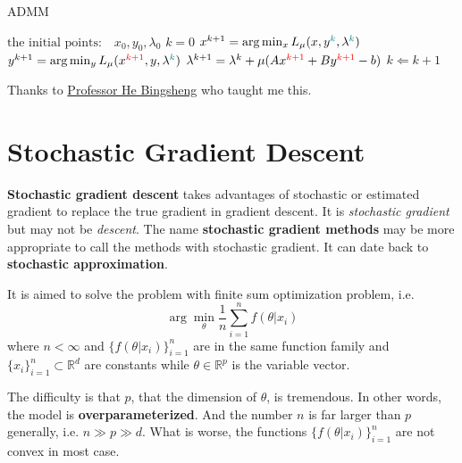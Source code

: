\documentclass[titlestyle=hang,11pt]{elegantbook}
\begin{document}
\begin{algorithm}
	\caption{ADMM}
	\label{ADMM}
	\begin{algorithmic}
	\REQUIRE $\text{the initial points:}\quad x_0, y_0, {\lambda}_0$
	\ENSURE $k = 0$
	\STATE $x^{k+1}=\arg\min_{x}L_{\mu}(x,y^{\color{teal}{k}},\lambda^{\color{teal}{k}})$
	\STATE $y^{k+1}=\arg\min_{y} L_{\mu}(x^{\color{red}{k+1}}, y, \lambda^{\color{teal}{k}})$
	\STATE $\lambda^{k+1} = \lambda^{k}+\mu (Ax^{\color{red}{k+1}} + By^{\color{red}{k+1}}-b)$
	\STATE $k \Leftarrow  k + 1$
	\ENDWHILE
	\end{algorithmic}
\end{algorithm}


\begin{note}
	Thanks to \href{http://maths.nju.edu.cn/~hebma/}{Professor He Bingsheng} who taught me this.
\end{note}


\section{ Stochastic Gradient Descent}

\textbf{Stochastic gradient descent} takes advantages of stochastic or estimated gradient to replace the true gradient in gradient descent.
It is  \emph{stochastic gradient} but may not be \emph{descent}.
The name \textbf{stochastic gradient methods}  may be more appropriate to call the methods with stochastic gradient.
It can date back to \textbf{stochastic approximation}.

It is aimed to solve the problem with finite sum optimization problem, i.e.
$$\arg\min_{\theta}\frac{1}{n}\sum_{i=1}^{n}f(\theta|x_i)$$
where $n<\infty$ and $\{f(\theta|x_i)\}_{i=1}^{n}$ are in the same function family and $\{x_i\}_{i=1}^{n}\subset \mathbb{R}^{d}$ are constants
while $\theta\in\mathbb{R}^{p}$ is the variable vector.

The difficulty is that $p$, that the dimension of $\theta$, is tremendous. In other words, the model is \textbf{overparameterized}.
And the number $n$ is far larger than $p$ generally, i.e. $n \gg  p\gg d$.
What is worse, the functions  $\{f(\theta|x_i)\}_{i=1}^{n}$ are not convex in most case.
\end{document}
